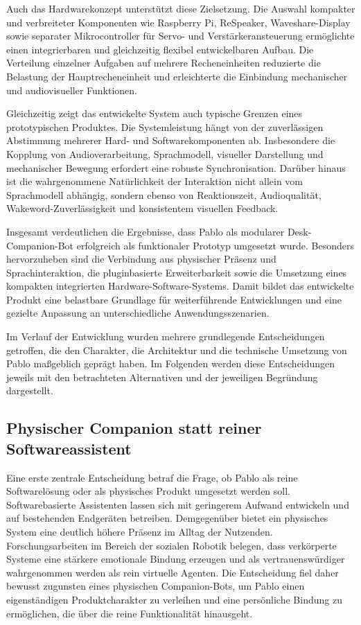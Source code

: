 Auch das Hardwarekonzept unterstützt diese Zielsetzung. Die Auswahl kompakter und verbreiteter Komponenten wie Raspberry Pi, ReSpeaker, Waveshare-Display sowie separater Mikrocontroller für Servo- und Verstärkeransteuerung ermöglichte einen integrierbaren und gleichzeitig flexibel entwickelbaren Aufbau. Die Verteilung einzelner Aufgaben auf mehrere Recheneinheiten reduzierte die Belastung der Hauptrecheneinheit und erleichterte die Einbindung mechanischer und audiovisueller Funktionen.

Gleichzeitig zeigt das entwickelte System auch typische Grenzen eines prototypischen Produktes. Die Systemleistung hängt von der zuverlässigen Abstimmung mehrerer Hard- und Softwarekomponenten ab. Insbesondere die Kopplung von Audioverarbeitung, Sprachmodell, visueller Darstellung und mechanischer Bewegung erfordert eine robuste Synchronisation. Darüber hinaus ist die wahrgenommene Natürlichkeit der Interaktion nicht allein vom Sprachmodell abhängig, sondern ebenso von Reaktionszeit, Audioqualität, Wakeword-Zuverlässigkeit und konsistentem visuellen Feedback.

Insgesamt verdeutlichen die Ergebnisse, dass Pablo als modularer Desk-Companion-Bot erfolgreich als funktionaler Prototyp umgesetzt wurde. Besonders hervorzuheben sind die Verbindung aus physischer Präsenz und Sprachinteraktion, die pluginbasierte Erweiterbarkeit sowie die Umsetzung eines kompakten integrierten Hardware-Software-Systems. Damit bildet das entwickelte Produkt eine belastbare Grundlage für weiterführende Entwicklungen und eine gezielte Anpassung an unterschiedliche Anwendungsszenarien.


Im Verlauf der Entwicklung wurden mehrere grundlegende Entscheidungen getroffen, die den Charakter, die Architektur und die technische Umsetzung von Pablo maßgeblich geprägt haben.
Im Folgenden werden diese Entscheidungen jeweils mit den betrachteten Alternativen und der jeweiligen Begründung dargestellt.

\subsection{Physischer Companion statt reiner Softwareassistent}

Eine erste zentrale Entscheidung betraf die Frage, ob Pablo als reine Softwarelösung oder als physisches Produkt umgesetzt werden soll.
Softwarebasierte Assistenten lassen sich mit geringerem Aufwand entwickeln und auf bestehenden Endgeräten betreiben.
Demgegenüber bietet ein physisches System eine deutlich höhere Präsenz im Alltag der Nutzenden.
Forschungsarbeiten im Bereich der sozialen Robotik belegen, dass verkörperte Systeme eine stärkere emotionale Bindung erzeugen und als vertrauenswürdiger wahrgenommen werden als rein virtuelle Agenten.
Die Entscheidung fiel daher bewusst zugunsten eines physischen Companion-Bots, um Pablo einen eigenständigen Produktcharakter zu verleihen und eine persönliche Bindung zu ermöglichen, die über die reine Funktionalität hinausgeht.

